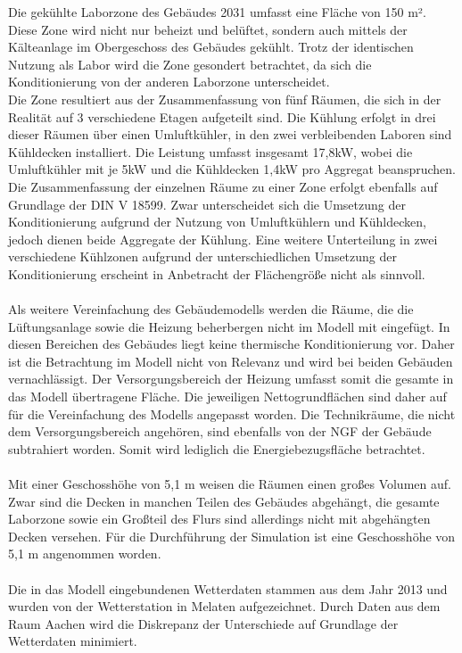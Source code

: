 Die gekühlte Laborzone des Gebäudes 2031 umfasst eine Fläche von 150 m². Diese Zone wird nicht nur beheizt und belüftet, sondern auch mittels der Kälteanlage im Obergeschoss des Gebäudes gekühlt. Trotz der identischen Nutzung als Labor wird die Zone gesondert betrachtet, da sich die Konditionierung von der anderen Laborzone unterscheidet. \\
Die Zone resultiert aus der Zusammenfassung von fünf Räumen, die sich in der Realität auf 3 verschiedene Etagen aufgeteilt sind. Die Kühlung erfolgt in drei dieser Räumen über einen Umluftkühler, in den zwei verbleibenden Laboren sind Kühldecken installiert. Die Leistung umfasst insgesamt 17,8kW, wobei die Umluftkühler mit je 5kW und die Kühldecken 1,4kW pro Aggregat beanspruchen. Die Zusammenfassung der einzelnen Räume zu einer Zone erfolgt ebenfalls auf Grundlage der DIN V 18599. 
Zwar unterscheidet sich die Umsetzung der Konditionierung aufgrund der Nutzung von Umluftkühlern und Kühldecken, jedoch dienen beide Aggregate der Kühlung. Eine weitere Unterteilung in zwei verschiedene Kühlzonen aufgrund der unterschiedlichen Umsetzung der Konditionierung erscheint in Anbetracht der Flächengröße nicht als sinnvoll.\\
\\
Als weitere Vereinfachung des Gebäudemodells werden die Räume, die die Lüftungsanlage sowie die Heizung beherbergen nicht im Modell mit eingefügt. In diesen Bereichen des Gebäudes liegt keine thermische Konditionierung vor. Daher ist die Betrachtung im Modell nicht von Relevanz und wird bei beiden Gebäuden vernachlässigt. Der Versorgungsbereich der Heizung umfasst somit die gesamte in das Modell übertragene Fläche. Die jeweiligen Nettogrundflächen sind daher auf für die Vereinfachung des Modells angepasst worden. Die Technikräume, die nicht dem Versorgungsbereich angehören, sind ebenfalls von der NGF der Gebäude subtrahiert worden. Somit wird lediglich die Energiebezugsfläche betrachtet. \\
\\
Mit einer Geschosshöhe von 5,1 m weisen die Räumen einen großes Volumen auf. Zwar sind die Decken in manchen Teilen des Gebäudes abgehängt, die gesamte Laborzone sowie ein Großteil des Flurs sind allerdings nicht mit abgehängten Decken versehen. Für die Durchführung der Simulation ist eine Geschosshöhe von 5,1 m angenommen worden.\\
\\
Die in das Modell eingebundenen Wetterdaten stammen aus dem Jahr 2013 und wurden von der Wetterstation in Melaten aufgezeichnet. Durch Daten aus dem Raum Aachen wird die Diskrepanz der Unterschiede auf Grundlage der Wetterdaten minimiert.\\
